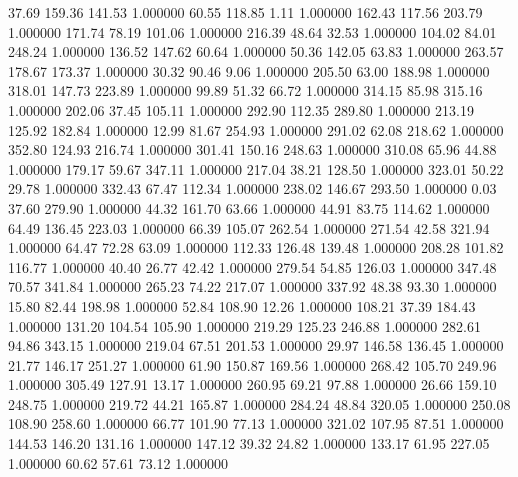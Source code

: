      37.69    159.36    141.53  1.000000
     60.55    118.85      1.11  1.000000
    162.43    117.56    203.79  1.000000
    171.74     78.19    101.06  1.000000
    216.39     48.64     32.53  1.000000
    104.02     84.01    248.24  1.000000
    136.52    147.62     60.64  1.000000
     50.36    142.05     63.83  1.000000
    263.57    178.67    173.37  1.000000
     30.32     90.46      9.06  1.000000
    205.50     63.00    188.98  1.000000
    318.01    147.73    223.89  1.000000
     99.89     51.32     66.72  1.000000
    314.15     85.98    315.16  1.000000
    202.06     37.45    105.11  1.000000
    292.90    112.35    289.80  1.000000
    213.19    125.92    182.84  1.000000
     12.99     81.67    254.93  1.000000
    291.02     62.08    218.62  1.000000
    352.80    124.93    216.74  1.000000
    301.41    150.16    248.63  1.000000
    310.08     65.96     44.88  1.000000
    179.17     59.67    347.11  1.000000
    217.04     38.21    128.50  1.000000
    323.01     50.22     29.78  1.000000
    332.43     67.47    112.34  1.000000
    238.02    146.67    293.50  1.000000
      0.03     37.60    279.90  1.000000
     44.32    161.70     63.66  1.000000
     44.91     83.75    114.62  1.000000
     64.49    136.45    223.03  1.000000
     66.39    105.07    262.54  1.000000
    271.54     42.58    321.94  1.000000
     64.47     72.28     63.09  1.000000
    112.33    126.48    139.48  1.000000
    208.28    101.82    116.77  1.000000
     40.40     26.77     42.42  1.000000
    279.54     54.85    126.03  1.000000
    347.48     70.57    341.84  1.000000
    265.23     74.22    217.07  1.000000
    337.92     48.38     93.30  1.000000
     15.80     82.44    198.98  1.000000
     52.84    108.90     12.26  1.000000
    108.21     37.39    184.43  1.000000
    131.20    104.54    105.90  1.000000
    219.29    125.23    246.88  1.000000
    282.61     94.86    343.15  1.000000
    219.04     67.51    201.53  1.000000
     29.97    146.58    136.45  1.000000
     21.77    146.17    251.27  1.000000
     61.90    150.87    169.56  1.000000
    268.42    105.70    249.96  1.000000
    305.49    127.91     13.17  1.000000
    260.95     69.21     97.88  1.000000
     26.66    159.10    248.75  1.000000
    219.72     44.21    165.87  1.000000
    284.24     48.84    320.05  1.000000
    250.08    108.90    258.60  1.000000
     66.77    101.90     77.13  1.000000
    321.02    107.95     87.51  1.000000
    144.53    146.20    131.16  1.000000
    147.12     39.32     24.82  1.000000
    133.17     61.95    227.05  1.000000
     60.62     57.61     73.12  1.000000
